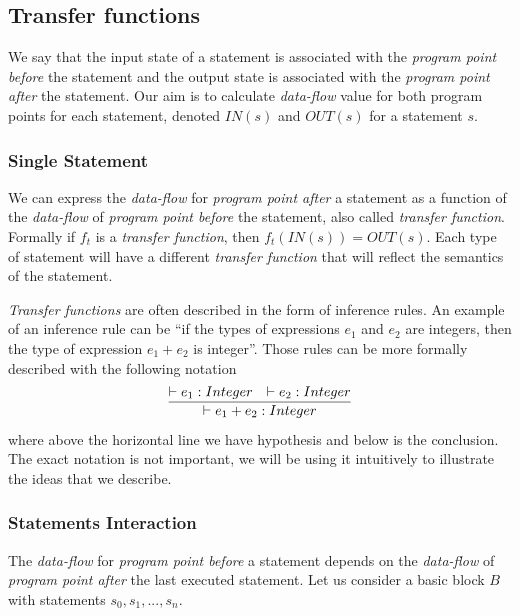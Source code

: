         \subsection{Transfer functions}
        
        We say that the input state of a statement is associated with 
        the \emph{program point before} the statement and the output state 
        is associated with the \emph{program point after} the statement. 
        Our aim is to calculate \emph{data-flow} value for both 
        program points for each statement, denoted $IN(s)$ and $OUT(s)$ for 
        a statement $s$.
        
        \subsubsection*{Single Statement}
        
        We can express the \emph{data-flow} for \emph{program point after} 
        a statement as a function of the \emph{data-flow} of 
        \emph{program point before} the statement, also called \emph{transfer function}. 
        Formally if $f_t$ is a \emph{transfer function}, then $f_t(IN(s))=OUT(s)$.
        Each type of statement will have a different \emph{transfer function} 
        that will reflect the semantics of the statement. 
        
        \emph{Transfer functions} are often described in the form of inference rules. 
        An example of an inference rule can be 
        ``if the types of expressions $e_1$ and $e_2$ are integers, then the type of 
        expression $e_1+e_2$ is integer''. Those rules can be more formally 
        described with the following notation        
        $$
        \infer{\vdash e_1+e_2 : Integer}{\vdash e_1 : Integer & \vdash e_2 : Integer}
        $$        
        where above the horizontal line we have hypothesis and below is 
        the conclusion. The exact notation is not important, we will be using it 
        intuitively to illustrate the ideas that we describe.
        
        \subsubsection*{Statements Interaction}
        
        The \emph{data-flow} for \emph{program point before} a statement 
        depends on the \emph{data-flow} of \emph{program point after} the 
        last executed statement. Let us consider a basic block $B$ with 
        statements $s_0, s_1, ..., s_n$.
        
